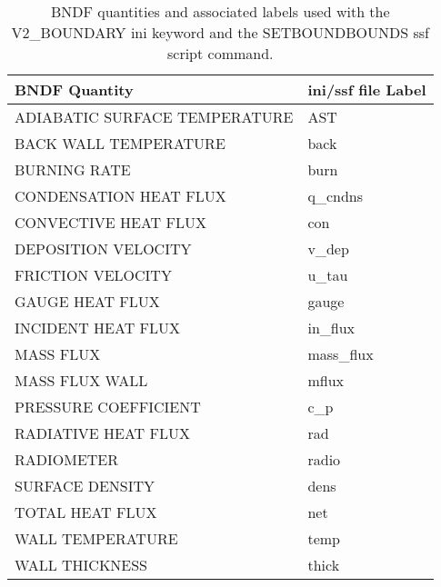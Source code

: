 \begin{table}[bph]
\begin{center}
\caption{BNDF quantities and associated labels used with the V2\_BOUNDARY ini keyword and the SETBOUNDBOUNDS ssf script command.}
\vspace{0.1in}
\begin{tabular}{|l|l|}
\hline
BNDF Quantity & ini/ssf file Label \\ \hline
 ADIABATIC SURFACE TEMPERATURE  &   AST \\ \hline
 BACK WALL TEMPERATURE  &   back \\ \hline
 BURNING RATE  &   burn \\ \hline
 CONDENSATION HEAT FLUX  &   q\_cndns \\ \hline
 CONVECTIVE HEAT FLUX  &   con \\ \hline
 DEPOSITION VELOCITY  &   v\_dep \\ \hline
 FRICTION VELOCITY  &   u\_tau \\ \hline
 GAUGE HEAT FLUX  &   gauge \\ \hline
 INCIDENT HEAT FLUX  &   in\_flux \\ \hline
 MASS FLUX  &   mass\_flux \\ \hline
 MASS FLUX WALL  &   mflux \\ \hline
 PRESSURE COEFFICIENT  &   c\_p \\ \hline
 RADIATIVE HEAT FLUX  &   rad \\ \hline
 RADIOMETER  &   radio \\ \hline
 SURFACE DENSITY  &   dens \\ \hline
 TOTAL HEAT FLUX  &   net \\ \hline
 WALL TEMPERATURE  &   temp \\ \hline
 WALL THICKNESS  &   thick \\ \hline
\end{tabular}
\label{tabBNDF}
\end{center}
\end{table}
